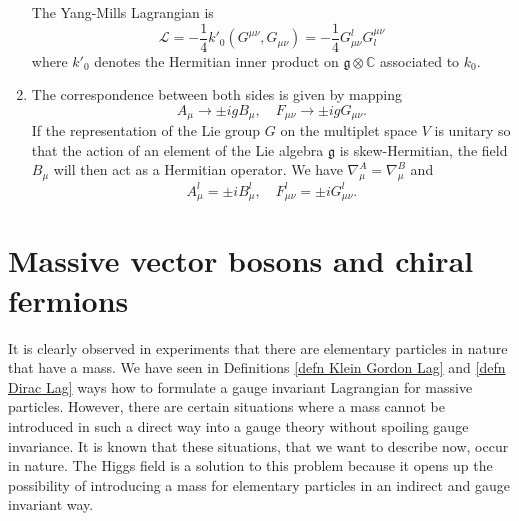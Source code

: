 \documentclass[11pt]{amsart}
\theoremstyle{definition}
\theoremstyle{remark}
\numberwithin{equation}{section}
\begin{document}
\begin{enumerate}
\begin{equation*}
\end{equation*}
The Yang-Mills Lagrangian is
\begin{equation*}
\mathcal{L}=-\frac{1}{4}k'_0(G^{\mu\nu},G_{\mu\nu})=-\frac{1}{4}G_{\mu\nu}^lG^{\mu\nu}_l
\end{equation*}
where $k'_0$ denotes the Hermitian inner product on $\mathfrak{g}\otimes\mathbb{C}$ associated to $k_0$.
\item The correspondence between both sides is given by mapping
\begin{equation*}
A_\mu\rightarrow \pm igB_\mu,\quad F_{\mu\nu}\rightarrow \pm igG_{\mu\nu}.
\end{equation*}
If the representation of the Lie group $G$ on the multiplet space $V$ is unitary so that the action of an element of the Lie algebra $\mathfrak{g}$ is skew-Hermitian, the field $B_\mu$ will then act as a Hermitian operator. We have $\nabla^A_\mu=\nabla^B_\mu$ and
\begin{equation*}
A_\mu^l=\pm iB_\mu^l,\quad F_{\mu\nu}^l=\pm iG_{\mu\nu}^l.
\end{equation*}
\end{enumerate}





\section{Massive vector bosons and chiral fermions}\label{sect massive boson chiral fermion}

It is clearly observed in experiments that there are elementary particles in nature that have a mass. We have seen in Definitions \ref{defn Klein Gordon Lag} and \ref{defn Dirac Lag} ways how to formulate a gauge invariant Lagrangian for massive particles. However, there are certain situations where a mass cannot be introduced in such a direct way into a gauge theory without spoiling gauge invariance. It is known that these situations, that we want to describe now, occur in nature. The Higgs field is a solution to this problem because it opens up the possibility of introducing a mass for elementary particles in an indirect and gauge invariant way.
\end{document}
